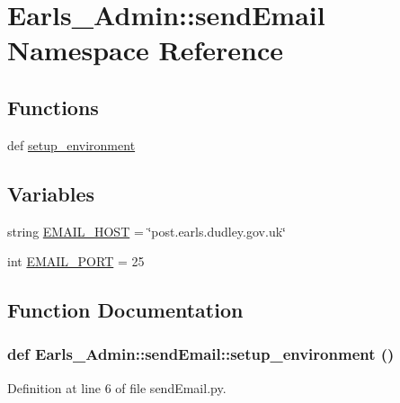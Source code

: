 \hypertarget{namespaceEarls__Admin_1_1sendEmail}{
\section{Earls\_\-Admin::sendEmail Namespace Reference}
\label{namespaceEarls__Admin_1_1sendEmail}
}


\subsection*{Functions}
\begin{CompactItemize}
\item 
def \hyperlink{namespaceEarls__Admin_1_1sendEmail_331b06fbe1e2d4af01c8f740118056a0}{setup\_\-environment}
\end{CompactItemize}
\subsection*{Variables}
\begin{CompactItemize}
\item 
string \hyperlink{namespaceEarls__Admin_1_1sendEmail_c59c372a8f135fa45f5e215a181d538e}{EMAIL\_\-HOST} = \char`\"{}post.earls.dudley.gov.uk\char`\"{}
\item 
int \hyperlink{namespaceEarls__Admin_1_1sendEmail_8f6a9a2cc878074795d5d7146a56a4d1}{EMAIL\_\-PORT} = 25
\end{CompactItemize}


\subsection{Function Documentation}
\hypertarget{namespaceEarls__Admin_1_1sendEmail_331b06fbe1e2d4af01c8f740118056a0}{
\subsubsection[setup\_\-environment]{\setlength{\rightskip}{0pt plus 5cm}def Earls\_\-Admin::sendEmail::setup\_\-environment ()}}
\label{namespaceEarls__Admin_1_1sendEmail_331b06fbe1e2d4af01c8f740118056a0}




Definition at line 6 of file sendEmail.py.

